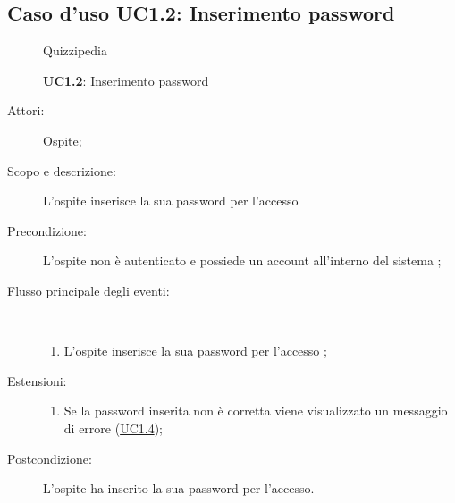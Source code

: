 \subsection{Caso d'uso UC1.2: Inserimento password}
\begin{figure}[H]
	\centering
	\begin{resizedtikzpicture}{\textwidth}
		\begin{umlsystem}[x=0, fill=lightgray!20]{Quizzipedia}
		\end{umlsystem}
	\end{resizedtikzpicture}
	\caption{\textbf{UC1.2}: Inserimento password}
	\label{UC1.2}
\end{figure}
\begin{description}
	\item[Attori:] Ospite;
	\item[Scopo e descrizione:] L'ospite inserisce la sua password per l'accesso
	\item[Precondizione:] L'ospite non è autenticato e possiede un account all'interno del sistema
	;
	
	\item[Flusso principale degli eventi:] \ 
	\begin{enumerate}
		\item L'ospite inserisce la sua password per l'accesso
		;
		
	\end{enumerate}
	\item[Estensioni:]
	\begin{enumerate}
		\item Se la password inserita non è corretta viene visualizzato un messaggio di errore (\hyperlink{UC1.4}{UC1.4});
		
	\end{enumerate}
	\item[Postcondizione:] L'ospite ha inserito la sua password per l'accesso.
\end{description}
\hypertarget{UC1.3}{}
